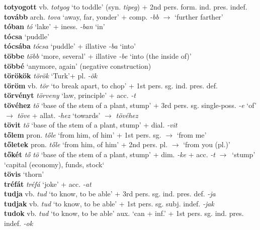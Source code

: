 \documentclass[11pt]{article}
\begin{document}
\textbf{totyogott} vb. \emph{totyog} `to toddle' (syn. \emph{tipeg}) +
2nd pers. form. ind. pres. indef. \\
\textbf{tovább} arch. \emph{tova} `away, far, yonder' +
comp. \emph{-bb} $\rightarrow$ `further farther' \\
\textbf{tóban} \emph{tó} `lake' + iness. \emph{-ban} `in' \\
\textbf{tócsa} `puddle' \\
\textbf{tócsába} \emph{tócsa} `puddle' + illative \emph{-ba} `into' \\
\textbf{többe} \emph{több} `more, several' + illative \emph{-be}
`into (the inside of)' \\
\textbf{többé} `anymore, again' (negative construction) \\
\textbf{törökök} \emph{török} `Turk'+ pl. \emph{-ök} \\
\textbf{töröm} vb. \emph{tör} `to break apart, to chop' + 1st
pers. sg. ind. pres. def. \\
\textbf{törvényt} \emph{törveny} `law, principle' + acc. \emph{-t} \\
\textbf{tövéhez} \emph{tö} `base of the stem of a plant, stump' + 3rd
pers. sg. single\hyp{}poss. \emph{-e} `of' $\rightarrow$ \emph{töve} +
allat. \emph{-hez} `towards' $\rightarrow$ \emph{tövéhez} \\
\textbf{tövit} \emph{tö} `base of the stem of a plant, stump' + dial. \emph{-vit} \\
\textbf{tőlem} pron. \emph{tőle} `from him, of him' + 1st pers. sg. $\rightarrow$
  `from me' \\
\textbf{tőletek} pron. \emph{tőle} `from him, of him' + 2nd
pers. pl. $\rightarrow$ `from you (pl.)' \\
\textbf{tőkét} \emph{tő} \emph{tö} `base of the stem of a plant, stump'
+ dim. \emph{-ke} + acc. \emph{-t} $\rightarrow$\
`stump' \textbar\textbar{} `capital (economy), funds, stock` \\
\textbf{tövis} `thorn' \\
\textbf{tréfát} \emph{tréfá} `joke' + acc. \emph{-at} \\
\textbf{tudja} vb. \emph{tud} `to know, to be able' + 3rd
pers. sg. ind. pres. def. \emph{-ja} \\
\textbf{tudjak} vb. \emph{tud} `to know, to be able' + 1st
pers. sg. subj. indef. \emph{-jak} \\
\textbf{tudok} vb. \emph{tud} `to know, to be able' \textbar\textbar{} aux. `can +
inf.' + 1st pers. sg. ind. pres. indef. \emph{-ok} \\
\end{document}
